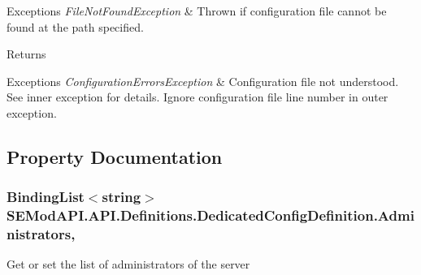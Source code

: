 \begin{DoxyExceptions}{Exceptions}
{\em File\+Not\+Found\+Exception} & Thrown if configuration file cannot be found at the path specified.\\
\hline
\end{DoxyExceptions}
\begin{DoxyReturn}{Returns}

\end{DoxyReturn}

\begin{DoxyExceptions}{Exceptions}
{\em Configuration\+Errors\+Exception} & Configuration file not understood. See inner exception for details. Ignore configuration file line number in outer exception.\\
\hline
\end{DoxyExceptions}


\subsection{Property Documentation}
\hypertarget{class_s_e_mod_a_p_i_1_1_a_p_i_1_1_definitions_1_1_dedicated_config_definition_a817adae3e7136d5917dac5ac2f8d7db7}{}
\subsubsection[{Administrators}]{\setlength{\rightskip}{0pt plus 5cm}Binding\+List$<$string$>$ S\+E\+Mod\+A\+P\+I.\+A\+P\+I.\+Definitions.\+Dedicated\+Config\+Definition.\+Administrators\hspace{0.3cm}{\ttfamily [get]}, {\ttfamily [set]}}\label{class_s_e_mod_a_p_i_1_1_a_p_i_1_1_definitions_1_1_dedicated_config_definition_a817adae3e7136d5917dac5ac2f8d7db7}


Get or set the list of administrators of the server 

\hypertarget{class_s_e_mod_a_p_i_1_1_a_p_i_1_1_definitions_1_1_dedicated_config_definition_a3536b5c5146e9c0a8e576e2534248f05}{}
